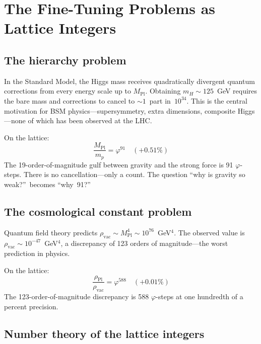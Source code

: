 \documentclass[12pt,a4paper]{article}
\newcommand{\vp}{\varphi}
\newcommand{\MPl}{M_{\mathrm{Pl}}}
\begin{document}
\section{The Fine-Tuning Problems as Lattice Integers}
\label{sec:finetuning}

\subsection{The hierarchy problem}
\label{sec:hierarchy}

In the Standard Model, the Higgs mass receives quadratically divergent quantum
corrections from every energy scale up to $\MPl$.  Obtaining
$m_H \sim 125$~GeV requires the bare mass and corrections to cancel to
$\sim\!1$~part in~$10^{34}$.  This is the central motivation for BSM
physics---supersymmetry, extra dimensions, composite Higgs---none of which has
been observed at the LHC.

On the lattice:
\begin{equation}
  \boxed{\frac{\MPl}{m_p} = \vp^{91} \quad (+0.51\%)}
  \label{eq:hierarchy_lattice}
\end{equation}
The 19-order-of-magnitude gulf between gravity and the strong force is 91
$\vp$-steps.  There is no cancellation---only a count.  The question
``why is gravity so weak?''\ becomes ``why~91?''

\subsection{The cosmological constant problem}
\label{sec:cc}

Quantum field theory predicts
$\rho_{\mathrm{vac}} \sim M_{\mathrm{Pl}}^4 \sim 10^{76}$~GeV$^4$.  The
observed value is $\rho_{\mathrm{vac}} \sim 10^{-47}$~GeV$^4$, a discrepancy
of 123 orders of magnitude---the worst prediction in physics.

On the lattice:
\begin{equation}
  \boxed{\frac{\rho_{\mathrm{Pl}}}{\rho_{\mathrm{vac}}} = \vp^{588}
  \quad (+0.01\%)}
  \label{eq:cc_lattice}
\end{equation}
The 123-order-of-magnitude discrepancy is 588 $\vp$-steps at one hundredth
of a percent precision.

\subsection{Number theory of the lattice integers}
\label{sec:number_theory}
\end{document}
